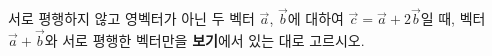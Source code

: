 서로 평행하지 않고 영벡터가 아닌 두 벡터 $\vec{a}$, $\vec{b}$에 대하여 $\vec{c}=\vec{a}+2\vec{b}$일 때, 벡터 $\vec{a}+\vec{b}$와 서로 평행한 벡터만을 \textbf{보기}에서 있는 대로 고르시오. 
